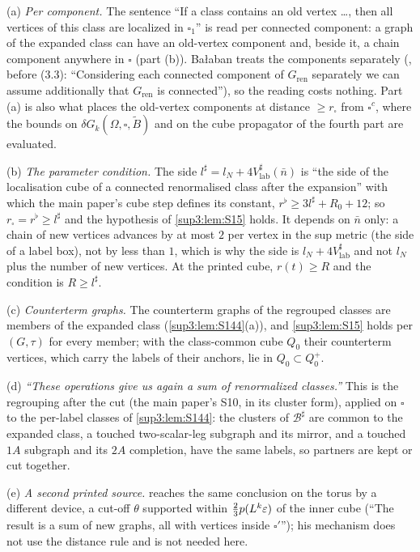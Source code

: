 \begin{remark}\label{sup3:rem:S15}
(a) \emph{Per component.} The sentence ``If a class contains an old vertex \dots, then all vertices of this class are localized in $\square_1$'' is read per connected component: a graph of the expanded class can have an old-vertex component and, beside it, a chain component anywhere in $\square$ (part (b)). Ba{\l}aban treats the components separately (\cite[p.~433]{Ba3}, before (3.3): ``Considering each connected component of $G_{\mathrm{ren}}$ separately we can assume additionally that $G_{\mathrm{ren}}$ is connected''), so the reading costs nothing. Part (a) is also what places the old-vertex components at distance $\ge r_\square$ from $\square^c$, where the bounds on $\delta G_k(\Omega,\square,\tilde B)$ and on the cube propagator of the fourth part are evaluated.

(b) \emph{The parameter condition.} The side $l^\sharp=l_N+4V^\sharp_{\mathrm{lab}}(\bar n)$ is ``the side of the localisation cube of a connected renormalised class after the expansion'' with which the main paper's cube step defines its constant, $r^\flat\ge3l^\sharp+R_0+12$; so $r_\square=r^\flat\ge l^\sharp$ and the hypothesis of \cref{sup3:lem:S15} holds. It depends on $\bar n$ only: a chain of new vertices advances by at most $2$ per vertex in the sup metric (the side of a label box), not by less than $1$, which is why the side is $l_N+4V^\sharp_{\mathrm{lab}}$ and not $l_N$ plus the number of new vertices. At the printed cube, $r(t)\ge R$ and the condition is $R\ge l^\sharp$.

(c) \emph{Counterterm graphs.} The counterterm graphs of the regrouped classes are members of the expanded class (\cref{sup3:lem:S144}(a)), and \cref{sup3:lem:S15} holds per $(G,\tau)$ for every member; with the class-common cube $Q_0$ their counterterm vertices, which carry the labels of their anchors, lie in $Q_0\subset Q_0^+$.

(d) \emph{``These operations give us again a sum of renormalized classes.''} This is the regrouping after the cut (the main paper's S10, in its cluster form), applied on $\square$ to the per-label classes of \cref{sup3:lem:S144}: the clusters of $\mathcal B^\sharp$ are common to the expanded class, a touched two-scalar-leg subgraph and its mirror, and a touched $1A$ subgraph and its $2A$ completion, have the same labels, so partners are kept or cut together.

(e) \emph{A second printed source.} \cite[Sect.~3.4]{K1} reaches the same conclusion on the torus by a different device, a cut-off $\theta$ supported within $\frac23p(L^k\varepsilon)$ of the inner cube (``The result is a sum of new graphs, all with vertices inside $\square'$''); his mechanism does not use the distance rule and is not needed here.
\end{remark}
